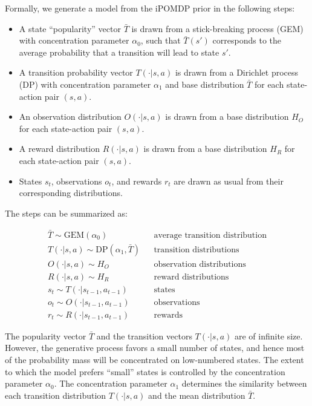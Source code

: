 \documentclass[11pt]{article}
\begin{document}
Formally, we generate a model from the iPOMDP prior in the following steps: 

\begin{itemize}
\item A state ``popularity'' vector $\bar{T}$ is drawn from a stick-breaking process (GEM) \cite{Teh2006} with concentration parameter $\alpha_0$, such that $\bar{T}(s')$ corresponds to the average probability that a transition will lead to state $s'$.
\item A transition probability vector $T(\cdot | s,a)$ is drawn from a Dirichlet process (DP) \cite{Teh2006} with concentration parameter $\alpha_1$ and base distribution $\bar{T}$ for each state-action pair $(s,a)$.
\item An observation distribution $O(\cdot|s,a)$ is drawn from a base distribution $H_O$ for each state-action pair $(s,a)$.
\item A reward distribution $R(\cdot|s,a)$ is drawn from a base distribution $H_R$ for each state-action pair $(s,a)$.
\item States $s_t$, observations $o_t$, and rewards $r_t$ are drawn as usual from their corresponding distributions.
\end{itemize}

The steps can be summarized as:

\begin{align*}
\bar{T} \sim \text{GEM}(\alpha_0)  		&& \text{average transition distribution} \\
T(\cdot | s,a) \sim \text{DP}(\alpha_1, \bar{T})		 && \text{transition distributions}\\
O(\cdot | s,a) \sim H_O 				&& \text{observation distributions}\\
R(\cdot | s,a) \sim H_R 				&& \text{reward distributions}\\
s_t \sim T(\cdot | s_{t-1},a_{t-1}) 		&& \text{states}\\
o_t \sim O(\cdot | s_{t-1}, a_{t-1})		&& \text{observations} \\
r_t \sim R(\cdot | s_{t-1}, a_{t-1})		&& \text{rewards} 
\end{align*}

The popularity vector $\bar{T}$ and the transition vectors $T(\cdot | s,a)$ are of infinite size. However, the generative process favors a small number of states, and hence most of the probability mass will be concentrated on low-numbered states. The extent to which the model prefers ``small'' states is controlled by the concentration parameter $\alpha_0$. The concentration parameter $\alpha_1$ determines the similarity between each transition distribution $T(\cdot | s,a)$ and the mean distribution $\bar{T}$. 
\end{document}
